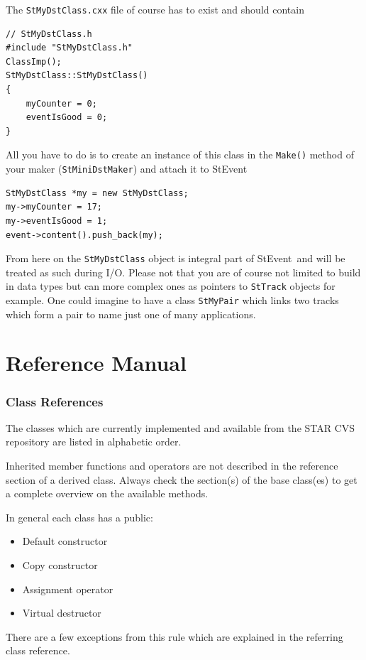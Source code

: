 \documentclass[twoside]{article}
\newcommand{\StEvent}{\textsf{StEvent}}
\begin{document}
The \texttt{StMyDstClass.cxx} file of course has to exist and should contain
\begin{verbatim}
// StMyDstClass.h
#include "StMyDstClass.h"
ClassImp();
StMyDstClass::StMyDstClass()
{
    myCounter = 0;
    eventIsGood = 0;
}
\end{verbatim}

All you have to do is to create an instance of this class in the \texttt{Make()} method
of your maker (\texttt{StMiniDstMaker}) and attach it to \StEvent\:

\begin{verbatim}
StMyDstClass *my = new StMyDstClass;
my->myCounter = 17;
my->eventIsGood = 1;
event->content().push_back(my);
\end{verbatim}

From here on the \texttt{StMyDstClass} object is integral part of \StEvent\ and
will be treated as such during I/O.
Please not that you are of course not limited to build in data types
but can more complex ones as pointers to \texttt{StTrack} objects for example.
One could imagine to have a class \texttt{StMyPair} which links two tracks which form
a pair to name just one of many applications. 

\clearpage

%
%
\part{Reference Manual}
\clearpage

\section{Class References} %
The classes which are currently implemented and available from the
STAR CVS repository are listed in alphabetic order.

Inherited member functions and operators are not described in the
reference section of a derived class. Always check the section(s) of
the base class(es) to get a complete overview on the available
methods.

In general each class has a public:
\begin{itemize}
\item Default constructor
\item Copy constructor
\item Assignment operator
\item Virtual destructor
\end{itemize}
There are a few exceptions from this rule which are explained in the
referring class reference.
\end{document}
